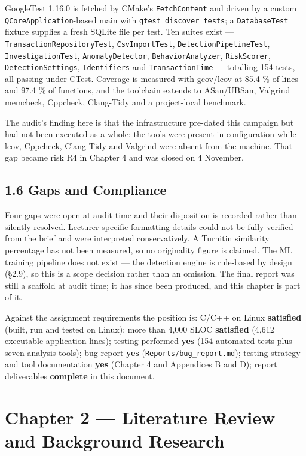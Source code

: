 \documentclass[
  12pt,
]{report}
\begin{document}
GoogleTest 1.16.0 is fetched by CMake's \texttt{FetchContent} and driven
by a custom \texttt{QCore\-Application}-based main with
\texttt{gtest\_discover\_tests}; a \texttt{DatabaseTest} fixture
supplies a fresh SQLite file per test. Ten suites exist ---
\texttt{Transaction\-Repository\-Test}, \texttt{CsvImportTest},
\texttt{Detection\-Pipeline\-Test}, \texttt{Investigation\-Test},
\texttt{AnomalyDetector}, \texttt{Behavior\-Analyzer},
\texttt{RiskScorer}, \texttt{Detection\-Settings}, \texttt{Identifiers}
and \texttt{TransactionTime} --- totalling 154 tests, all passing under
CTest. Coverage is measured with gcov/lcov at 85.4 \% of lines and 97.4
\% of functions, and the toolchain extends to ASan/UBSan, Valgrind
memcheck, Cppcheck, Clang-Tidy and a project-local benchmark.

The audit's finding here is that the infrastructure pre-dated this
campaign but had not been executed as a whole: the tools were present in
configuration while lcov, Cppcheck, Clang-Tidy and Valgrind were absent
from the machine. That gap became risk R4 in Chapter 4 and was closed on
4 November.

\section{1.6 Gaps and Compliance}\label{gaps-and-compliance}

Four gaps were open at audit time and their disposition is recorded
rather than silently resolved. Lecturer-specific formatting details
could not be fully verified from the brief and were interpreted
conservatively. A Turnitin similarity percentage has not been measured,
so no originality figure is claimed. The ML training pipeline does not
exist --- the detection engine is rule-based by design (§2.9), so this
is a scope decision rather than an omission. The final report was still
a scaffold at audit time; it has since been produced, and this chapter
is part of it.

Against the assignment requirements the position is: C/C++ on Linux
\textbf{satisfied} (built, run and tested on Linux); more than 4,000
SLOC \textbf{satisfied} (4,612 executable application lines); testing
performed \textbf{yes} (154 automated tests plus seven analysis tools);
bug report \textbf{yes} (\texttt{Reports/\allowbreak{}bug\_report.md}); testing
strategy and tool documentation \textbf{yes} (Chapter 4 and Appendices B
and D); report deliverables \textbf{complete} in this document.

\chapter{Chapter 2 --- Literature Review and Background
Research}\label{chapter-2-literature-review-and-background-research}
\end{document}
